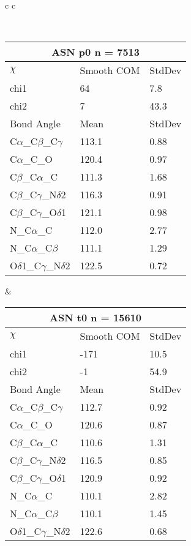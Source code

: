 \begin{longtable}{ c c }

\caption{ASN Central Values}\\
  \begin{tabular}{ l l l }
  \toprule
  \multicolumn{3}{c}{ASN \textbf{p0} n = 7513} \\ \toprule
  $\chi$       & Smooth COM & StdDev \\ \midrule
  chi1 & 64 & 7.8 \\ 
  chi2 & 7 & 43.3 \\ \midrule
  Bond Angle   & Mean     & StdDev \\ \midrule
  C$\alpha$\_C$\beta$\_C$\gamma$ & 113.1 & 0.88\\
  C$\alpha$\_C\_O & 120.4 & 0.97\\
  C$\beta$\_C$\alpha$\_C & 111.3 & 1.68\\
  C$\beta$\_C$\gamma$\_N$\delta$2 & 116.3 & 0.91\\
  C$\beta$\_C$\gamma$\_O$\delta$1 & 121.1 & 0.98\\
  N\_C$\alpha$\_C & 112.0 & 2.77\\
  N\_C$\alpha$\_C$\beta$ & 111.1 & 1.29\\
  O$\delta$1\_C$\gamma$\_N$\delta$2 & 122.5 & 0.72\\
  \bottomrule
  \end{tabular}
  &
  \begin{tabular}{ l l l }
  \toprule
  \multicolumn{3}{c}{ASN \textbf{t0} n = 15610} \\ \toprule
  $\chi$       & Smooth COM & StdDev \\ \midrule
  chi1 & -171 & 10.5 \\ 
  chi2 & -1 & 54.9 \\ \midrule
  Bond Angle   & Mean     & StdDev \\ \midrule
  C$\alpha$\_C$\beta$\_C$\gamma$ & 112.7 & 0.92\\
  C$\alpha$\_C\_O & 120.6 & 0.87\\
  C$\beta$\_C$\alpha$\_C & 110.6 & 1.31\\
  C$\beta$\_C$\gamma$\_N$\delta$2 & 116.5 & 0.85\\
  C$\beta$\_C$\gamma$\_O$\delta$1 & 120.9 & 0.92\\
  N\_C$\alpha$\_C & 110.1 & 2.82\\
  N\_C$\alpha$\_C$\beta$ & 110.1 & 1.45\\
  O$\delta$1\_C$\gamma$\_N$\delta$2 & 122.6 & 0.68\\
  \bottomrule
  \end{tabular}

\end{longtable}
